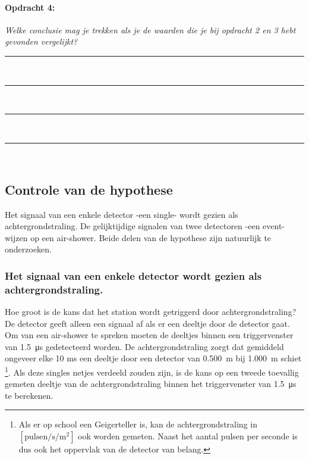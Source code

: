 \bigskip{}


\begin{minipage}[t]{1\columnwidth}%

\paragraph{Opdracht 4:}

\textit{Welke conclusie mag je trekken als je de waarden die je bij
opdracht 2 en 3 hebt gevonden vergelijkt?}

\begin{center}
    \rule{\textwidth}{0.3mm}\\
    \rule{\textwidth}{0.3mm}\\
    \rule{\textwidth}{0.3mm}\\
    \rule{\textwidth}{0.3mm}\\
\end{center}
\end{minipage}


\subsection{Controle van de hypothese}

Het signaal van een enkele detector -een single- wordt gezien als
achtergrondstraling. De gelijktijdige signalen van twee detectoren
-een event- wijzen op een air-shower. Beide delen van de hypothese
zijn natuurlijk te onderzoeken.


\subsubsection{Het signaal van een enkele detector wordt gezien als achtergrondstraling.}

Hoe groot is de kans dat het station wordt getriggerd door achtergrondstraling?
De detector geeft alleen een signaal af als er een deeltje door de
detector gaat. Om van een air-shower te spreken moeten de deeltjes
binnen een triggervenster van \SI{1.5}{\micro\second} gedetecteerd
worden. De achtergrondstraling zorgt dat gemiddeld ongeveer elke
10 ms een deeltje door een detector van \SI{0.500}{\meter} bij \SI{1.000}{\meter}
schiet%
\footnote{Als er op school een Geigerteller is, kan de achtergrondstraling in
$\mathrm{\left[pulsen/s/m^{2}\right]}$ ook worden gemeten. Naast
het aantal pulsen per seconde is dus ook het oppervlak van de detector
van belang.%
}. Als deze singles netjes verdeeld zouden zijn, is de kans op een
tweede toevallig gemeten deeltje van de achtergrondstraling binnen
het triggervenster van \SI{1.5}{\micro\second} te berekenen.


